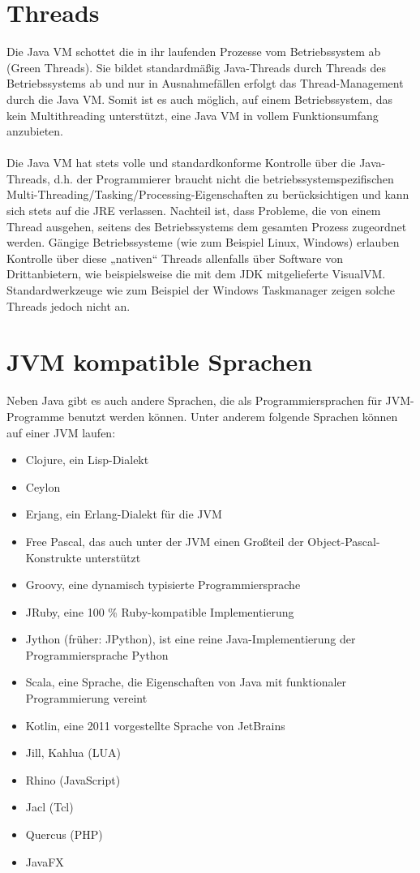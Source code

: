 \documentclass[a4paper,14pt]{scrreprt}
\begin{document}
\section{Threads}
Die Java VM schottet die in ihr laufenden Prozesse vom Betriebssystem ab (Green Threads). Sie bildet standardmäßig Java-Threads durch Threads des Betriebssystems ab und nur in Ausnahmefällen erfolgt das Thread-Management durch die Java VM. Somit ist es auch möglich, auf einem Betriebssystem, das kein Multithreading unterstützt, eine Java VM in vollem Funktionsumfang anzubieten. \\\\Die Java VM hat stets volle und standardkonforme Kontrolle über die Java-Threads, d.h. der Programmierer braucht nicht die betriebssystemspezifischen Multi-Threading/Tasking/Processing-Eigenschaften zu berücksichtigen und kann sich stets auf die JRE verlassen. Nachteil ist, dass Probleme, die von einem Thread ausgehen, seitens des Betriebssystems dem gesamten Prozess zugeordnet werden. Gängige Betriebssysteme (wie zum Beispiel Linux, Windows) erlauben Kontrolle über diese „nativen“ Threads allenfalls über Software von Drittanbietern, wie beispielsweise die mit dem JDK mitgelieferte VisualVM. Standardwerkzeuge wie zum Beispiel der Windows Taskmanager zeigen solche Threads jedoch nicht an.
\section{JVM kompatible Sprachen}
Neben Java gibt es auch andere Sprachen, die als Programmiersprachen für JVM-Programme benutzt werden können. Unter anderem folgende Sprachen können auf einer JVM laufen:
\begin{itemize}
\item Clojure, ein Lisp-Dialekt
\item Ceylon
\item Erjang, ein Erlang-Dialekt für die JVM
\item Free Pascal, das auch unter der JVM einen Großteil der Object-Pascal-Konstrukte unterstützt
\item Groovy, eine dynamisch typisierte Programmiersprache
\item JRuby, eine 100 \% Ruby-kompatible Implementierung
\item Jython (früher: JPython), ist eine reine Java-Implementierung der Programmiersprache Python
\item Scala, eine Sprache, die Eigenschaften von Java mit funktionaler Programmierung vereint
\item Kotlin, eine 2011 vorgestellte Sprache von JetBrains
\item Jill, Kahlua (LUA)
\item Rhino (JavaScript)
\item Jacl (Tcl)
\item Quercus (PHP)
\item JavaFX
\end{itemize}\cite{ullen2011}\cite{jvmEin}\cite{jvmEin1}
\end{document}
